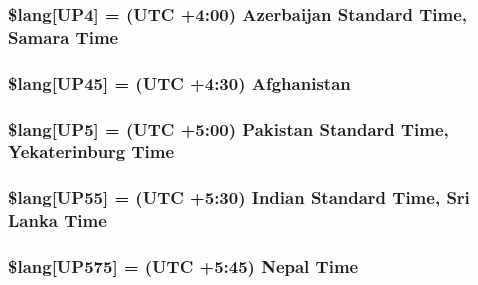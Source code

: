 \subsubsection[{\$lang}]{\setlength{\rightskip}{0pt plus 5cm}\$lang\mbox{[}\textquotesingle{}U\+P4\textquotesingle{}\mbox{]} = \textquotesingle{}(U\+T\+C +4\+:00) Azerbaijan Standard Time, Samara Time\textquotesingle{}}\label{date__lang_8php_ad0131a14a1ede9328baf1a1827602f45}
\hypertarget{date__lang_8php_a7795735f3608127d726a4fca3f87dc79}{}
\subsubsection[{\$lang}]{\setlength{\rightskip}{0pt plus 5cm}\$lang\mbox{[}\textquotesingle{}U\+P45\textquotesingle{}\mbox{]} = \textquotesingle{}(U\+T\+C +4\+:30) Afghanistan\textquotesingle{}}\label{date__lang_8php_a7795735f3608127d726a4fca3f87dc79}
\hypertarget{date__lang_8php_a08236ffa5ff4db9f2bc023f5256fead1}{}
\subsubsection[{\$lang}]{\setlength{\rightskip}{0pt plus 5cm}\$lang\mbox{[}\textquotesingle{}U\+P5\textquotesingle{}\mbox{]} = \textquotesingle{}(U\+T\+C +5\+:00) Pakistan Standard Time, Yekaterinburg Time\textquotesingle{}}\label{date__lang_8php_a08236ffa5ff4db9f2bc023f5256fead1}
\hypertarget{date__lang_8php_aa55a1ebecdfbd5e0c7e40c921b90cad2}{}
\subsubsection[{\$lang}]{\setlength{\rightskip}{0pt plus 5cm}\$lang\mbox{[}\textquotesingle{}U\+P55\textquotesingle{}\mbox{]} = \textquotesingle{}(U\+T\+C +5\+:30) Indian Standard Time, Sri Lanka Time\textquotesingle{}}\label{date__lang_8php_aa55a1ebecdfbd5e0c7e40c921b90cad2}
\hypertarget{date__lang_8php_abc4186fc3bc853aa036b5b11eeb52ecd}{}
\subsubsection[{\$lang}]{\setlength{\rightskip}{0pt plus 5cm}\$lang\mbox{[}\textquotesingle{}U\+P575\textquotesingle{}\mbox{]} = \textquotesingle{}(U\+T\+C +5\+:45) Nepal Time\textquotesingle{}}\label{date__lang_8php_abc4186fc3bc853aa036b5b11eeb52ecd}
\hypertarget{date__lang_8php_aaa655de76a3be875d9cedbf4a57244fa}{}

